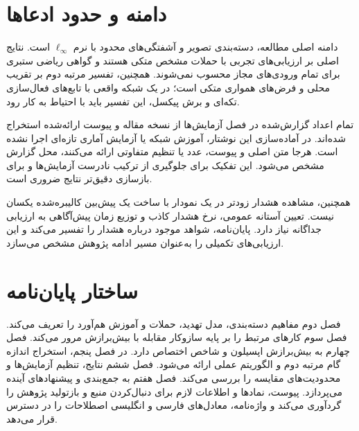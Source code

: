 \section{دامنه و حدود ادعاها}
دامنه اصلی مطالعه، دسته‌بندی تصویر و آشفتگی‌های محدود با نرم $\ell_\infty$ است. نتایج اصلی بر ارزیابی‌های تجربی با حملات مشخص متکی هستند و گواهی ریاضی ستبری برای تمام ورودی‌های مجاز محسوب نمی‌شوند. همچنین، تفسیر مرتبه دوم بر تقریب محلی و فرض‌های همواری متکی است؛ در یک شبکه واقعی با تابع‌های فعال‌سازی تکه‌ای و برش پیکسل، این تفسیر باید با احتیاط به کار رود.

تمام اعداد گزارش‌شده در فصل آزمایش‌ها از نسخه مقاله و پیوست ارائه‌شده استخراج شده‌اند. در آماده‌سازی این نوشتار، آموزش شبکه یا آزمایش آماری تازه‌ای اجرا نشده است. هرجا متن اصلی و پیوست، عدد یا تنظیم متفاوتی ارائه می‌کنند، محل گزارش مشخص می‌شود. این تفکیک برای جلوگیری از ترکیب نادرست آزمایش‌ها و برای بازسازی دقیق‌تر نتایج ضروری است.

همچنین، مشاهده هشدار زودتر در یک نمودار با ساخت یک پیش‌بین کالیبره‌شده یکسان نیست. تعیین آستانه عمومی، نرخ هشدار کاذب و توزیع زمان پیش‌آگاهی به ارزیابی جداگانه نیاز دارد. پایان‌نامه، شواهد موجود درباره هشدار را تفسیر می‌کند و این ارزیابی‌های تکمیلی را به‌عنوان مسیر ادامه پژوهش مشخص می‌سازد.

\section{ساختار پایان‌نامه}
فصل دوم مفاهیم دسته‌بندی، مدل تهدید، حملات و آموزش هم‌آورد را تعریف می‌کند. فصل سوم کارهای مرتبط را بر پایه سازوکار مقابله با بیش‌برازش مرور می‌کند. فصل چهارم به بیش‌برازش اپسیلون و شاخص \pertalign{} اختصاص دارد. در فصل پنجم، استخراج اندازه گام مرتبه دوم و الگوریتم عملی \sora{} ارائه می‌شود. فصل ششم نتایج، تنظیم آزمایش‌ها و محدودیت‌های مقایسه را بررسی می‌کند. فصل هفتم به جمع‌بندی و پیشنهادهای آینده می‌پردازد. پیوست، نمادها و اطلاعات لازم برای دنبال‌کردن منبع و بازتولید پژوهش را گردآوری می‌کند و واژه‌نامه، معادل‌های فارسی و انگلیسی اصطلاحات را در دسترس قرار می‌دهد.
